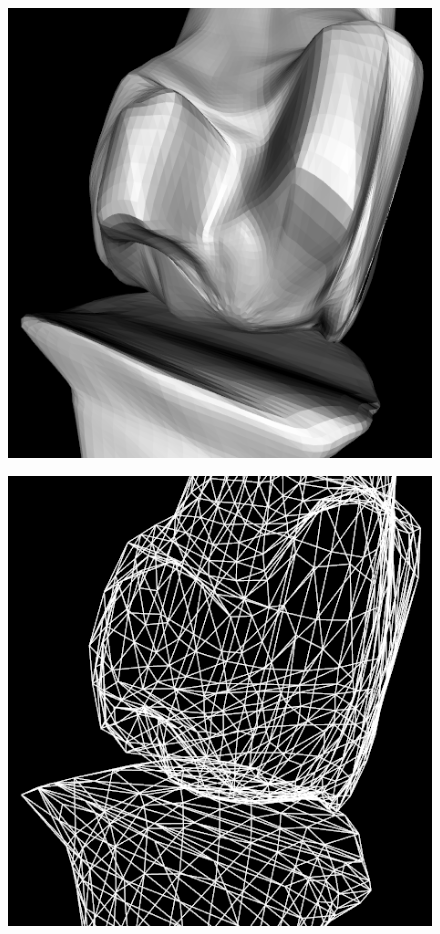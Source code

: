 \documentclass[10pt, conference, compsocconf]{IEEEtran}
\begin{document}
\begin{figure}[htbp]
{\begin{minipage}[h]{0.16\linewidth}
        \includegraphics[width=\textwidth]{./Figure/footbones/fingerBones/butterfly3.png}\vspace{1ex}\\
      \end{minipage}%
      \begin{minipage}[h]{0.16\linewidth}
        \centering
        \includegraphics[width=\textwidth]{./Figure/footbones/fingerBones/butterfly1-.png}\\

\end{minipage}}
\end{figure}
\end{document}
